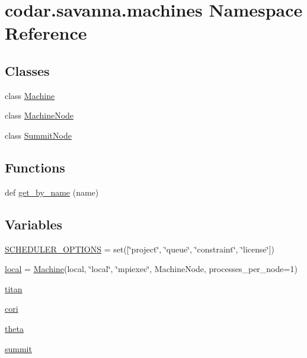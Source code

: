 \hypertarget{namespacecodar_1_1savanna_1_1machines}{}\section{codar.\+savanna.\+machines Namespace Reference}
\label{namespacecodar_1_1savanna_1_1machines}
\subsection*{Classes}
\begin{DoxyCompactItemize}
\item 
class \hyperlink{classcodar_1_1savanna_1_1machines_1_1_machine}{Machine}
\item 
class \hyperlink{classcodar_1_1savanna_1_1machines_1_1_machine_node}{Machine\+Node}
\item 
class \hyperlink{classcodar_1_1savanna_1_1machines_1_1_summit_node}{Summit\+Node}
\end{DoxyCompactItemize}
\subsection*{Functions}
\begin{DoxyCompactItemize}
\item 
def \hyperlink{namespacecodar_1_1savanna_1_1machines_ac40865c4cf034c7fa8326851739415c4}{get\+\_\+by\+\_\+name} (name)
\end{DoxyCompactItemize}
\subsection*{Variables}
\begin{DoxyCompactItemize}
\item 
\hyperlink{namespacecodar_1_1savanna_1_1machines_a7049022ca489351967d953e3cbb4d0b0}{S\+C\+H\+E\+D\+U\+L\+E\+R\+\_\+\+O\+P\+T\+I\+O\+NS} = set(\mbox{[}\char`\"{}project\char`\"{}, \char`\"{}queue\char`\"{}, \char`\"{}constraint\char`\"{}, \char`\"{}license\char`\"{}\mbox{]})
\item 
\hyperlink{namespacecodar_1_1savanna_1_1machines_a5bc83c52f88721fcf5e8898f280bb460}{local} = \hyperlink{classcodar_1_1savanna_1_1machines_1_1_machine}{Machine}(\textquotesingle{}local\textquotesingle{}, \char`\"{}local\char`\"{}, \char`\"{}mpiexec\char`\"{}, Machine\+Node, processes\+\_\+per\+\_\+node=1)
\item 
\hyperlink{namespacecodar_1_1savanna_1_1machines_ad70e3909df8e02f3a0cb9ab6aff13ce5}{titan}
\item 
\hyperlink{namespacecodar_1_1savanna_1_1machines_ae762bc41067e70cd1eba556e01af93fa}{cori}
\item 
\hyperlink{namespacecodar_1_1savanna_1_1machines_aa6fd3932b348a23c463f4f1d81e3a130}{theta}
\item 
\hyperlink{namespacecodar_1_1savanna_1_1machines_ad875f427da66b32cbb7a87f1c2eaa91f}{summit}
\end{DoxyCompactItemize}


